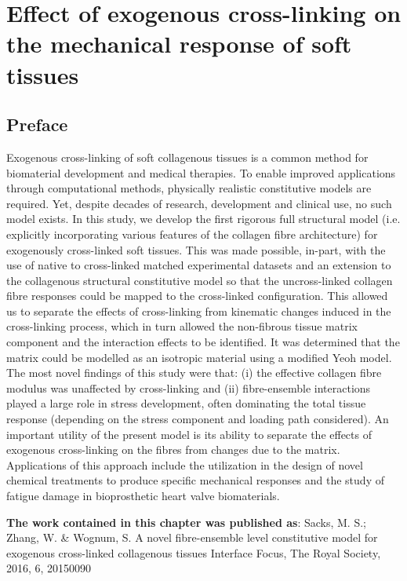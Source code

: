 \chapter{Effect of exogenous cross-linking on the mechanical response of soft tissues}


\section*{Preface}
%

    Exogenous cross-linking of soft collagenous tissues is a common method for biomaterial development and medical therapies. To enable improved applications through computational methods, physically realistic constitutive models are required. Yet, despite decades of research, development and clinical use, no such model exists. In this study, we develop the first rigorous full structural model (i.e. explicitly incorporating various features of the collagen fibre architecture) for exogenously cross-linked soft tissues. This was made possible, in-part, with the use of native to cross-linked matched experimental datasets and an extension to the collagenous structural constitutive model so that the uncross-linked collagen fibre responses could be mapped to the cross-linked configuration. This allowed us to separate the effects of cross-linking from kinematic changes induced in the cross-linking process, which in turn allowed the non-fibrous tissue matrix component and the interaction effects to be identified. It was determined that the matrix could be modelled as an isotropic material using a modified Yeoh model. The most novel findings of this study were that: (i) the effective collagen fibre modulus was unaffected by cross-linking and (ii) fibre-ensemble interactions played a large role in stress development, often dominating the total tissue response (depending on the stress component and loading path considered). An important utility of the present model is its ability to separate the effects of exogenous cross-linking on the fibres from changes due to the matrix. Applications of this approach include the utilization in the design of novel chemical treatments to produce specific mechanical responses and the study of fatigue damage in bioprosthetic heart valve biomaterials.

\textbf{The work contained in this chapter was published as}:  Sacks, M. S.; Zhang, W. \& Wognum, S.
A novel fibre-ensemble level constitutive model for exogenous cross-linked collagenous tissues 
Interface Focus, The Royal Society, 2016, 6, 20150090 


